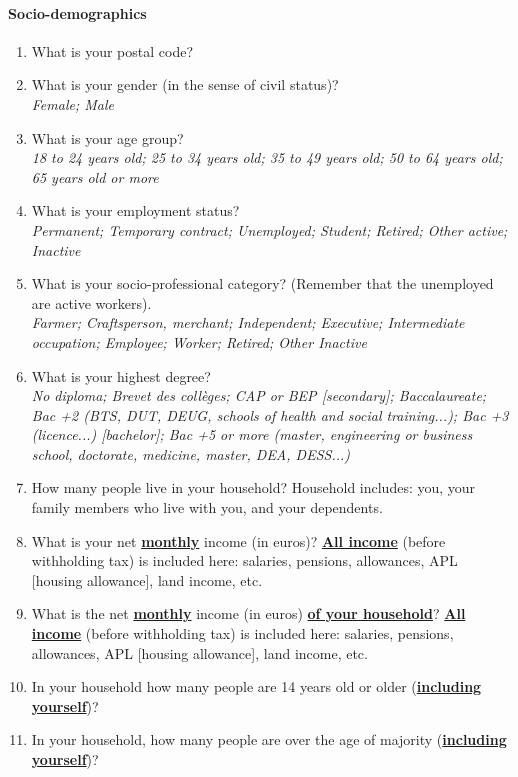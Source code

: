 \documentclass[12pt]{article} %
\begin{document}
\begin{appendices}
\paragraph{Socio-demographics}
\begin{enumerate}[resume,leftmargin=*]
\item What is your postal code? 
\item What is your gender (in the sense of civil status)? \emph{}\\
\emph{Female; Male }
\item What is your age group? \emph{}\\
\emph{18 to 24 years old; 25 to 34 years old; 35 to 49 years old;
50 to 64 years old; 65 years old or more} 
\item What is your employment status? \emph{}\\
\emph{Permanent; Temporary contract; Unemployed; Student; Retired;
Other active; Inactive}
\item What is your socio-professional category? (Remember that the unemployed
are active workers). \emph{}\\
\emph{Farmer; Craftsperson, merchant; Independent; Executive; Intermediate
occupation; Employee; Worker; Retired; Other Inactive} 
\item What is your highest degree? \emph{}\\
\emph{No diploma; Brevet des collèges; CAP or BEP {[}secondary{]};
Baccalaureate; Bac +2 (BTS, DUT, DEUG, schools of health and social
training...); Bac +3 (licence...) {[}bachelor{]}; Bac +5 or more (master,
engineering or business school, doctorate, medicine, master, DEA,
DESS...)}
\item How many people live in your household? Household includes: you, your
family members who live with you, and your dependents. 
\item What is your net \textbf{\underline{monthly}} income (in euros)? \textbf{\underline{All
income}} (before withholding tax) is included here: salaries, pensions,
allowances, APL {[}housing allowance{]}, land income, etc. 
\item What is the net \textbf{\underline{monthly}} income (in euros) \textbf{\underline{of
your household}}? \textbf{\underline{All income}} (before withholding
tax) is included here: salaries, pensions, allowances, APL {[}housing
allowance{]}, land income, etc. 
\item In your household how many people are 14 years old or older (\textbf{\underline{including
yourself}})? 
\item In your household, how many people are over the age of majority (\textbf{\underline{including
yourself}})? 
\end{enumerate}


\end{appendices}
\end{document}
